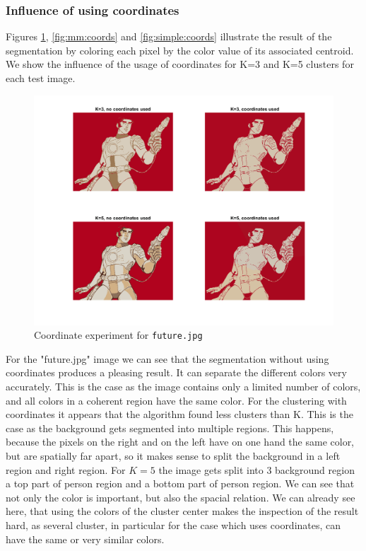 \subsubsection{Influence of using coordinates}

Figures \ref{fig:future:coords}, \ref{fig:mm:coords} and \ref{fig:simple:coords} illustrate the result of the segmentation by coloring each pixel by the color value of its associated centroid. We show the influence of the usage of coordinates for K=3 and K=5 clusters for each test image.
\begin{figure}[h]
\includegraphics[width = 0.9\linewidth]{figures/task2/future_coordinates.png}
\caption{Coordinate experiment for \texttt{future.jpg}}
\label{fig:future:coords}
\end{figure}
For the "future.jpg" image we can see that the segmentation without using coordinates produces a pleasing result. It can separate the different colors very accurately. This is the case as the image contains only a limited number of colors, and all colors in a coherent region have the same color. For the clustering with coordinates it appears that the algorithm found less clusters than K. This is the case as the background gets segmented into multiple regions. This happens, because the pixels on the right and on the left have on one hand the same color, but are spatially far apart, so it makes sense to split the background in a left region and right region. For $K=5$ the image gets split into 3 background region a top part of person region and a bottom part of person region. We can see that not only the color is important, but also the spacial relation. We can already see here, that using the colors of the cluster center makes the inspection of the result hard, as several cluster, in particular for the case which uses coordinates, can have the same or very similar colors.

